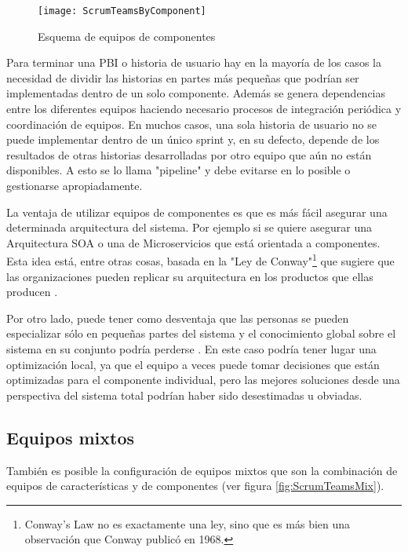 \begin{figure}[h]
  \centering
  \texttt{[image: ScrumTeamsByComponent]}
  \caption{Esquema de equipos de componentes}
  \centering
  \label{fig:ScrumTeamsByComponent} %
\end{figure}

Para terminar una PBI o historia de usuario hay en la mayoría de los casos la necesidad de dividir las historias en partes más pequeñas que podrían ser implementadas dentro de un solo componente. Además se genera dependencias entre los diferentes equipos haciendo necesario procesos de integración periódica y coordinación de equipos. En muchos casos, una sola historia de usuario no se puede implementar dentro de un único sprint y, en su defecto, depende de los resultados de otras historias desarrolladas por otro equipo que aún no están disponibles. A esto se lo llama "pipeline" y debe evitarse en lo posible o gestionarse apropiadamente.

La ventaja de utilizar equipos de componentes es que es más fácil asegurar una determinada arquitectura del sistema. Por ejemplo si se quiere asegurar una Arquitectura SOA o una de Microservicios que está orientada a componentes. Esta idea está, entre otras cosas, basada en la "Ley de Conway"\footnote{Conway's Law \cite{Conway-1968} no es exactamente una ley, sino que es más bien una observación que Conway publicó en 1968.} que sugiere que las organizaciones pueden replicar su arquitectura en los productos que ellas producen \cite{Martin-Fowler-2014}. 

Por otro lado, puede tener como desventaja que las personas se pueden especializar sólo en pequeñas partes del sistema y el conocimiento global sobre el sistema en su conjunto podría perderse \cite{Scrum-Institute-2015}. En este caso podría tener lugar una optimización local, ya que el equipo a veces puede tomar decisiones que están optimizadas para el componente individual, pero las mejores soluciones desde una perspectiva del sistema total podrían haber sido desestimadas u obviadas.


\subsection{Equipos mixtos}

También es posible la configuración de equipos mixtos que son la combinación de equipos de características y de componentes (ver figura \ref{fig:ScrumTeamsMix}).

